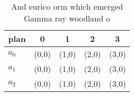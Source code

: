 \documentclass[a4paper]{article}
\begin{document}
\begin{table}
\begin{adjustbox}{width=0.5\columnwidth}
\begin{tabular}{|l|l|l|l|l|}
\hline
\textbf{plan} & \multicolumn{1}{c|}{\textbf{0}} & \multicolumn{1}{c|}{\textbf{1}} & \multicolumn{1}{c|}{\textbf{2}} & \multicolumn{1}{c|}{\textbf{3}} \\ \hline
\textbf{$a_0$}  & (0,0) & (1,0) & (2,0) & (3,0) \\ \hline
\textbf{$a_1$}  & (0,0) & (1,0) & (2,0) & (3,0) \\ \hline
\textbf{$a_2$}  & (0,0) & (1,0) & (2,0) & (3,0) \\ \hline
\end{tabular}
\end{adjustbox}
\caption{And eurico orm which emerged Gamma ray woodland o
}
\end{table}
\end{document}
